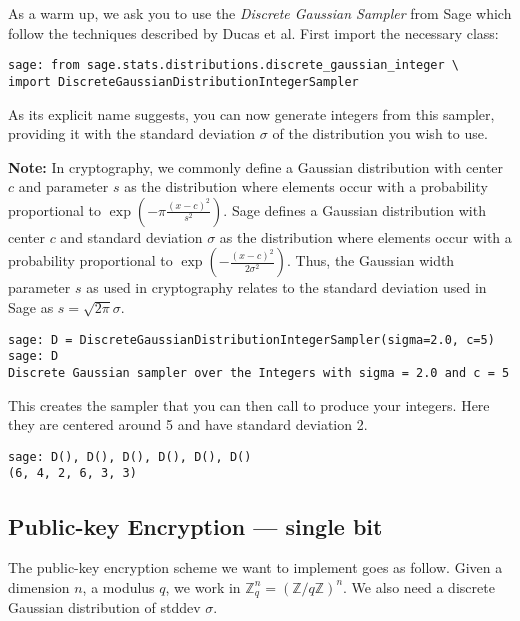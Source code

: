 \documentclass[10pt,a4paper,nobib]{tufte-handout}
\begin{document}
As a warm up, we ask you to use the \textit{Discrete Gaussian Sampler} from Sage which follow the techniques described by Ducas et al. First import the necessary class:

\lstset{language=sage,label= ,caption= ,captionpos=b,numbers=none}
\begin{lstlisting}
sage: from sage.stats.distributions.discrete_gaussian_integer \
import DiscreteGaussianDistributionIntegerSampler
\end{lstlisting}

As its explicit name suggests, you can now generate integers from this sampler, providing it with the standard deviation $\sigma$ of the distribution you wish to use.

\textbf{Note:} In cryptography, we commonly define a Gaussian distribution with center $c$ and parameter $s$ as the distribution where elements occur with a probability proportional to $\exp(-\pi\frac{{(x-c)}^2}{s^2})$. Sage defines a Gaussian distribution with center \(c\) and standard deviation \(\sigma\) as the distribution where elements occur with a probability proportional to $\exp(-\frac{{(x-c)}^2}{2\sigma^2})$. Thus, the Gaussian width parameter \(s\) as used in cryptography relates to the standard deviation used in Sage as \(s = \sqrt{2\pi}\sigma\).

\lstset{language=sage,label= ,caption= ,captionpos=b,numbers=none}
\begin{lstlisting}
sage: D = DiscreteGaussianDistributionIntegerSampler(sigma=2.0, c=5)
sage: D
Discrete Gaussian sampler over the Integers with sigma = 2.0 and c = 5
\end{lstlisting}

This creates the sampler that you can then call to produce your integers. Here they are centered around 5 and have standard deviation 2.

\lstset{language=sage,label= ,caption= ,captionpos=b,numbers=none}
\begin{lstlisting}
sage: D(), D(), D(), D(), D(), D()
(6, 4, 2, 6, 3, 3)
\end{lstlisting}

\subsection{Public-key Encryption --- single bit}

The public-key encryption scheme we want to implement goes as follow. Given a dimension $n$, a modulus $q$, we work in $\mathbb{Z}^n_q = (\mathbb{Z}/q\mathbb{Z})^n$. We also need a discrete Gaussian distribution of stddev $\sigma$.
\end{document}
